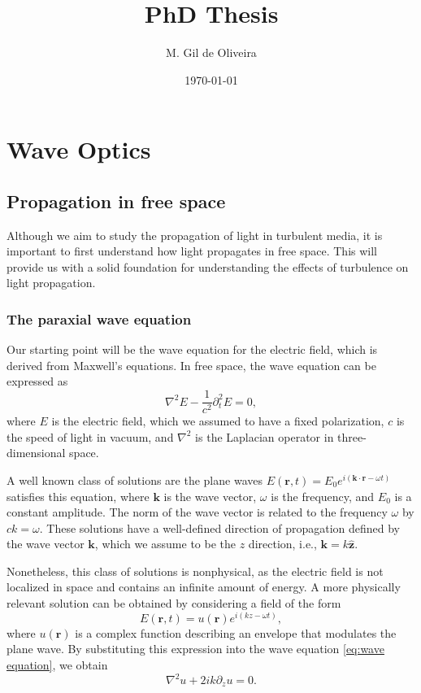 \documentclass[a4paper,10pt]{report}
\title{PhD Thesis}
\author{M. Gil de Oliveira}
\date{\today}
\begin{document}
\maketitle

\chapter{Wave Optics}

\section{Propagation in free space}

Although we aim to study the propagation of light in turbulent media, it is important to first understand how light propagates in free space. This will provide us with a solid foundation for understanding the effects of turbulence on light propagation.

\subsection{The paraxial wave equation}

Our starting point will be the wave equation for the electric field, which is derived from Maxwell's equations. In free space, the wave equation can be expressed as
\begin{equation}
    \label{eq:wave equation}
    \nabla^2 E - \frac{1}{c^2} \partial_t^2 E = 0,
\end{equation}
where $E$ is the electric field, which we assumed to have a fixed polarization, $c$ is the speed of light in vacuum, and $\nabla^2$ is the Laplacian operator in three-dimensional space. 

A well known class of solutions are the plane waves $E(\mathbf{r}, t) = E_0 e^{i(\mathbf{k} \cdot \mathbf{r} - \omega t)}$ satisfies this equation, where $\mathbf{k}$ is the wave vector, $\omega$ is the frequency, and $E_0$ is a constant amplitude. The norm of the wave vector is related to the frequency $\omega$ by $ck = \omega$. These solutions have a well-defined direction of propagation defined by the wave vector $\mathbf{k}$, which we assume to be the $z$ direction, i.e., $\mathbf{k} = k \hat{\mathbf{z}}$.

Nonetheless, this class of solutions is nonphysical, as the electric field is not localized in space and contains an infinite amount of energy. A more physically relevant solution can be obtained by considering a field of the form
\begin{equation}
    E(\mathbf{r}, t) = u(\mathbf{r}) e^{i(kz - \omega t)},
\end{equation}
where $u(\mathbf{r})$ is a complex function describing an envelope that modulates the plane wave. By substituting this expression into the wave equation \eqref{eq:wave equation}, we obtain
\begin{equation}
    \nabla^2 u + 2ik \partial_z u= 0.
\end{equation}
\end{document}

